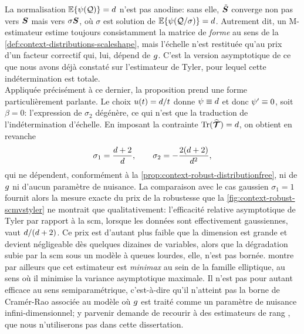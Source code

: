 La normalisation $\operatorname{\mathbb{E}}\{\psi(\mathcal{Q})\}=d$ n'est pas anodine: sans elle, $\tilde{\boldsymbol{S}}$ converge non pas vers $\boldsymbol{S}$ mais vers $\sigma\boldsymbol{S}$, où $\sigma$ est solution de $\operatorname{\mathbb{E}}\{\psi(\mathcal{Q}/\sigma)\}=d$. Autrement dit, un M-estimateur estime toujours consistamment la matrice de \emph{forme} au sens de la \cref{def:context-distributions-scaleshape}, mais l'échelle n'est restituée qu'au prix d'un facteur correctif qui, lui, dépend de $g$. C'est la version asymptotique de ce que nous avons déjà constaté sur l'estimateur de Tyler, pour lequel cette indétermination est totale. \\

Appliquée précisément à ce dernier, la proposition prend une forme particulièrement parlante. Le choix $u(t)=d/t$ donne $\psi\equiv d$ et donc $\psi'\equiv 0$, soit $\beta=0$: l'expression de $\sigma_2$ dégénère, ce qui n'est que la traduction de l'indétermination d'échelle. En imposant la contrainte $\operatorname{\operatorname{Tr}}(\widehat{\bm{\mathcal{T}}})=d$, on obtient en revanche
\begin{equation}
  \label{eq:context-robust-tylerasymptotic}
  \sigma_1 = \frac{d+2}{d},
  \qquad
  \sigma_2 = -\frac{2(d+2)}{d^{2}},
\end{equation}
qui ne dépendent, conformément à la \cref{prop:context-robust-distributionfree}, ni de $g$ ni d'aucun paramètre de nuisance. La comparaison avec le cas gaussien $\sigma_1=1$ fournit alors la mesure exacte du prix de la robustesse que la \cref{fig:context-robust-scmvstyler} ne montrait que qualitativement: l'efficacité relative asymptotique de Tyler par rapport à la scm, lorsque les données sont effectivement gaussiennes, vaut $d/(d+2)$. Ce prix est d'autant plus faible que la dimension est grande et devient négligeable dès quelques dizaines de variables, alors que la dégradation subie par la scm sous un modèle à queues lourdes, elle, n'est pas bornée.  montre par ailleurs que cet estimateur est \emph{minimax} au sein de la famille elliptique, au sens où il minimise la variance asymptotique maximale. Il n'est pas pour autant efficace au sens semiparamétrique, c'est-à-dire qu'il n'atteint pas la borne de Cramér-Rao associée au modèle où $g$ est traité comme un paramètre de nuisance infini-dimensionnel; y parvenir demande de recourir à des estimateurs de rang , que nous n'utiliserons pas dans cette dissertation.

